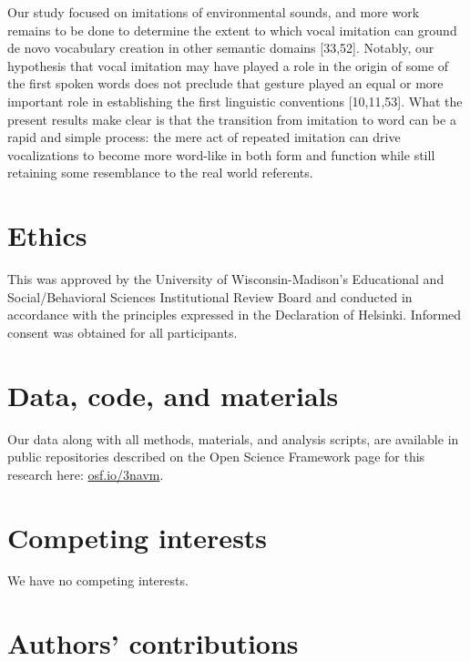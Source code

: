 \documentclass[english,floatsintext,man]{apa6}
\theoremstyle{definition}
\theoremstyle{definition}
\theoremstyle{definition}
\theoremstyle{remark}
\begin{document}
Our study focused on imitations of environmental sounds, and more work
remains to be done to determine the extent to which vocal imitation can
ground de novo vocabulary creation in other semantic domains
{[}33,52{]}. Notably, our hypothesis that vocal imitation may have
played a role in the origin of some of the first spoken words does not
preclude that gesture played an equal or more important role in
establishing the first linguistic conventions {[}10,11,53{]}. What the
present results make clear is that the transition from imitation to word
can be a rapid and simple process: the mere act of repeated imitation
can drive vocalizations to become more word-like in both form and
function while still retaining some resemblance to the real world
referents.

\hypertarget{ethics}{%
\section{Ethics}\label{ethics}}

This was approved by the University of Wisconsin-Madison's Educational
and Social/Behavioral Sciences Institutional Review Board and conducted
in accordance with the principles expressed in the Declaration of
Helsinki. Informed consent was obtained for all participants.

\hypertarget{data-code-and-materials}{%
\section{Data, code, and materials}\label{data-code-and-materials}}

Our data along with all methods, materials, and analysis scripts, are
available in public repositories described on the Open Science Framework
page for this research here: \href{https://osf.io/3navm}{osf.io/3navm}.

\hypertarget{competing-interests}{%
\section{Competing interests}\label{competing-interests}}

We have no competing interests.

\hypertarget{authors-contributions}{%
\section{Authors' contributions}\label{authors-contributions}}
\end{document}
